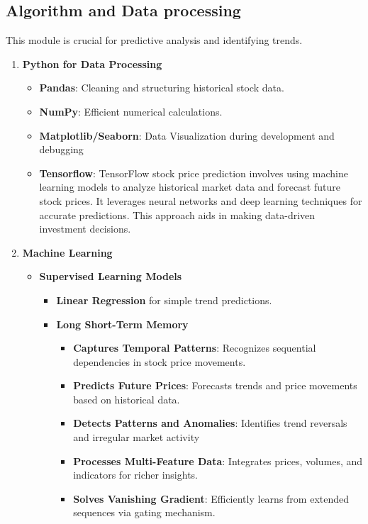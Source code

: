 \subsection{Algorithm and  Data processing}
This module is crucial for predictive analysis and identifying trends.
\begin{enumerate}
    \item \textbf{Python for Data Processing}
    \begin{itemize}
        \item \textbf{Pandas}: Cleaning and structuring historical stock data.
        \item \textbf{NumPy}: Efficient numerical calculations.
        \item \textbf{Matplotlib/Seaborn}: Data Visualization during development and debugging
        \item \textbf{Tensorflow}: 
TensorFlow stock price prediction involves using machine learning models to analyze historical market data and forecast future stock prices. It leverages neural networks and deep learning techniques for accurate predictions. This approach aids in making data-driven investment decisions.
    \end{itemize}
    \item \textbf{Machine Learning}
    \begin{itemize}
        \item \textbf{Supervised Learning Models}
        \begin{itemize}
            \item \textbf{Linear Regression} for simple trend predictions.
            \item \textbf{Long Short-Term Memory} 
            \begin{itemize}
                \item \textbf{Captures Temporal Patterns}: Recognizes sequential dependencies in stock price movements.
                \item \textbf{Predicts Future Prices}: Forecasts trends and price movements based on historical data.
                \item \textbf{Detects Patterns and Anomalies}: Identifies trend reversals and irregular market activity
                \item \textbf{Processes Multi-Feature Data}: Integrates prices, volumes, and indicators for richer insights.
                \item \textbf{Solves Vanishing Gradient}: Efficiently learns from extended sequences via gating mechanism.
            \end{itemize}
        \end{itemize}
    \end{itemize}
\end{enumerate}

